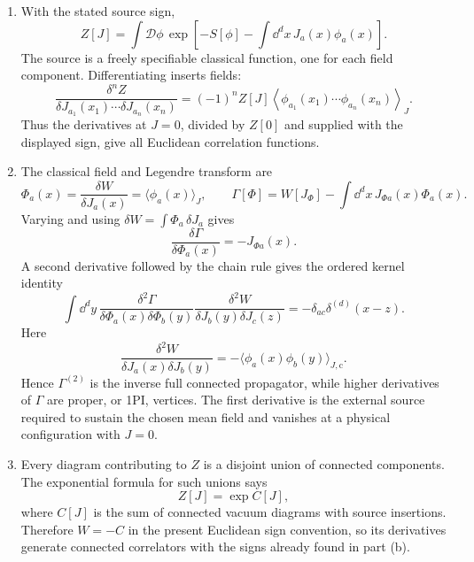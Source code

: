 \begin{enumerate}
  \begin{enumerate}
    \item[(a)]
    With the stated source sign,
    \[
      Z[J]=\int\mathcal D\phi\,
        \exp\!\left[-S[\phi]-\int \dd^dx\,J_a(x)\phi_a(x)\right].
    \]
    The source is a freely specifiable classical function, one for each
    field component.  Differentiating inserts fields:
    \[
      \frac{\delta^n Z}{\delta J_{a_1}(x_1)\cdots
        \delta J_{a_n}(x_n)}
        =(-1)^n Z[J]
          \left\langle\phi_{a_1}(x_1)\cdots
          \phi_{a_n}(x_n)\right\rangle_J.
    \]
    Thus the derivatives at \(J=0\), divided by \(Z[0]\) and supplied with
    the displayed sign, give all Euclidean correlation functions.
    \item[(b)]
    The classical field and Legendre transform are
    \[
      \Phi_a(x)=\frac{\delta W}{\delta J_a(x)}
        =\langle\phi_a(x)\rangle_J,
      \qquad
      \Gamma[\Phi]=W[J_\Phi]
        -\int \dd^dx\,J_{\Phi a}(x)\Phi_a(x).
    \]
    Varying and using \(\delta W=\int\Phi_a\,\delta J_a\) gives
    \[
      \frac{\delta\Gamma}{\delta\Phi_a(x)}=-J_{\Phi a}(x).
    \]
    A second derivative followed by the chain rule gives the ordered kernel
    identity
    \[
      \int \dd^dy\,
        \frac{\delta^2\Gamma}
          {\delta\Phi_a(x)\delta\Phi_b(y)}
        \frac{\delta^2W}
          {\delta J_b(y)\delta J_c(z)}
        =-\delta_{ac}\delta^{(d)}(x-z).
    \]
    Here
    \[
      \frac{\delta^2W}{\delta J_a(x)\delta J_b(y)}
        =-\langle\phi_a(x)\phi_b(y)\rangle_{J,\mathrm c}.
    \]
    Hence \(\Gamma^{(2)}\) is the inverse full connected propagator, while
    higher derivatives of \(\Gamma\) are proper, or 1PI, vertices.  The
    first derivative is the external source required to sustain the chosen
    mean field and vanishes at a physical configuration with \(J=0\).
    \item[(c)]
    Every diagram contributing to \(Z\) is a disjoint union of connected
    components.  The exponential formula for such unions says
    \[
      Z[J]=\exp C[J],
    \]
    where \(C[J]\) is the sum of connected vacuum diagrams with source
    insertions.  Therefore \(W=-C\) in the present Euclidean sign convention,
    so its derivatives generate connected correlators with the signs already
    found in part (b).


\end{enumerate}
\end{enumerate}
